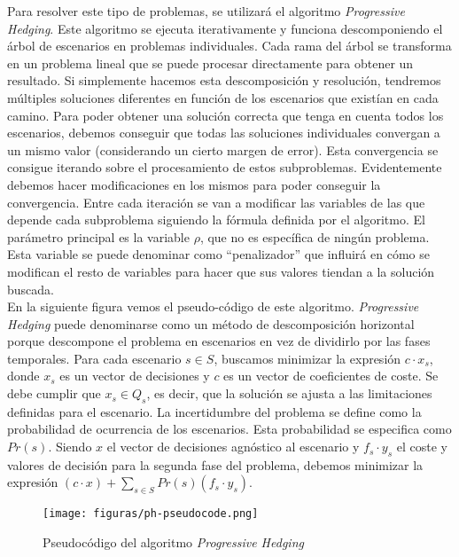 Para resolver este tipo de problemas, se utilizará el algoritmo \textit{Progressive Hedging}. Este algoritmo se ejecuta iterativamente y funciona descomponiendo el árbol de escenarios en problemas individuales. Cada rama del árbol se transforma en un problema lineal que se puede procesar directamente para obtener un resultado. Si simplemente hacemos esta descomposición y resolución, tendremos múltiples soluciones diferentes en función de los escenarios que existían en cada camino. Para poder obtener una solución correcta que tenga en cuenta todos los escenarios, debemos conseguir que todas las soluciones individuales convergan a un mismo valor (considerando un cierto margen de error). Esta convergencia se consigue iterando sobre el procesamiento de estos subproblemas. Evidentemente debemos hacer modificaciones en los mismos para poder conseguir la convergencia. Entre cada iteración se van a modificar las variables de las que depende cada subproblema siguiendo la fórmula definida por el algoritmo. El parámetro principal es la variable $\rho$, que no es específica de ningún problema. Esta variable se puede denominar como ``penalizador'' que influirá en cómo se modifican el resto de variables para hacer que sus valores tiendan a la solución buscada.\\

En la siguiente figura vemos el pseudo-código de este algoritmo. \textit{Progressive Hedging} puede denominarse como un método de descomposición horizontal porque descompone el problema en escenarios en vez de dividirlo por las fases temporales. Para cada escenario $s \in S$, buscamos minimizar la expresión $c \cdot x_s$, donde $x_s$ es un vector de decisiones y $c$ es un vector de coeficientes de coste. Se debe cumplir que $x_s \in Q_s$, es decir, que la solución se ajusta a las limitaciones definidas para el escenario.
La incertidumbre del problema se define como la probabilidad de ocurrencia de los escenarios. Esta probabilidad se especifica como $Pr(s)$. Siendo $x$ el vector de decisiones agnóstico al escenario y $f_s \cdot y_s$ el coste y valores de decisión para la segunda fase del problema, debemos minimizar la expresión $(c \cdot x) + \sum_{s \in S}{Pr(s)(f_s \cdot y_s)}$.

\begin{figure} [H]
    \centerline{\texttt{[image: figuras/ph-pseudocode.png]}}
    \caption{Pseudocódigo del algoritmo \textit{Progressive Hedging} \cite{progressiveHedging}}
    \label{fig:ph_pseudocode}
\end{figure}

